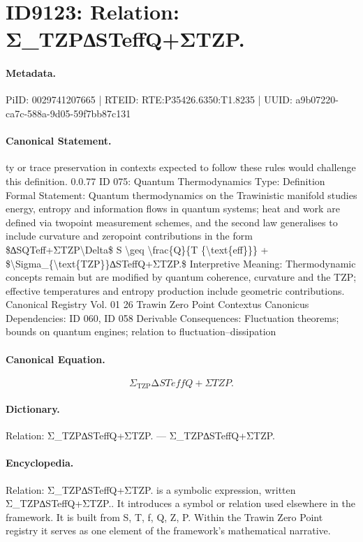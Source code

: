 \section*{ID9123: Relation: Σ\_TZP∆STeffQ+ΣTZP.}
\paragraph{Metadata.}
PiID: 0029741207665 | RTEID: RTE:P35426.6350:T1.8235 | UUID: a9b07220-ca7c-588a-9d05-59f7bb87c131

\paragraph{Canonical Statement.}
ty or trace preservation in contexts expected to follow these rules would challenge this definition. 0.0.77 ID 075: Quantum Thermodynamics Type: Definition Formal Statement: Quantum thermodynamics on the Trawinistic manifold studies energy, entropy and information flows in quantum systems; heat and work are defined via twopoint measurement schemes, and the second law generalises to include curvature and zeropoint contributions in the form \$∆SQTeff+ΣTZP\textbackslash{}Delta\$ S \textbackslash{}geq \textbackslash{}frac\{Q\}\{T \{\textbackslash{}text\{eff\}\}\} + \$\textbackslash{}Sigma\_\{\textbackslash{}text\{TZP\}\}∆STeffQ+ΣTZP.\$ Interpretive Meaning: Thermodynamic concepts remain but are modified by quantum coherence, curvature and the TZP; effective temperatures and entropy production include geometric contributions. Canonical Registry Vol. 01 26 Trawin Zero Point Contextus Canonicus Dependencies: ID 060, ID 058 Derivable Consequences: Fluctuation theorems; bounds on quantum engines; relation to fluctuation–dissipation

\paragraph{Canonical Equation.}
\[
\Sigma_{\text{TZP}}∆STeffQ+ΣTZP.
\]

\paragraph{Dictionary.}
Relation: Σ\_TZP∆STeffQ+ΣTZP. — Σ\_TZP∆STeffQ+ΣTZP.

\paragraph{Encyclopedia.}
Relation: Σ\_TZP∆STeffQ+ΣTZP. is a symbolic expression, written Σ\_TZP∆STeffQ+ΣTZP.. It introduces a symbol or relation used elsewhere in the framework. It is built from S, T, f, Q, Z, P. Within the Trawin Zero Point registry it serves as one element of the framework's mathematical narrative.
